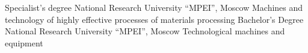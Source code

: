 \documentclass[11pt]{developercv} %
\begin{document}


\begin{entrylist}
    {Specialist's degree}
    {National Research University ``MPEI'', Moscow}
    {Machines and technology of highly effective processes of materials processing}
    {Bachelor's Degree}
    {National Research University ``MPEI'', Moscow}
    {Technological machines and equipment}
\end{entrylist}
\pagebreak


\end{document}
